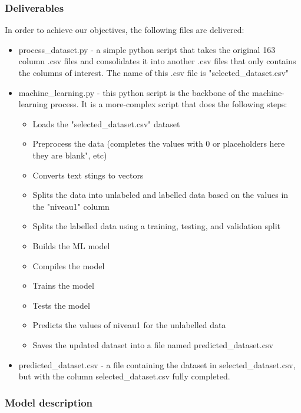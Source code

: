 \subsubsection{Deliverables}
In order to achieve our objectives, the following files are delivered: 
\begin{itemize}
    \item process\_dataset.py - a simple python script that takes the original 163 column .csv files and consolidates it into another .csv files that only contains the columns of interest. The name of this .csv file is "selected\_dataset.csv" 
    \item machine\_learning.py - this python script is the backbone of the machine-learning process. It is a more-complex script that does the following steps: 
        \begin{itemize}
            \item Loads the "selected\_dataset.csv" dataset
            \item Preprocess the data (completes the values with 0 or placeholders here they are blank", etc)
            \item Converts text stings to vectors
            \item Splits the data into unlabeled and labelled data based on the values in the "niveau1" column
            \item Splits the labelled data using a training, testing, and validation split
            \item Builds the ML model
            \item Compiles the model
            \item Trains the model
            \item Tests the model
            \item Predicts the values of niveau1 for the unlabelled data
            \item Saves the updated dataset into a file named predicted\_dataset.csv
        \end{itemize}
    \item predicted\_dataset.csv - a file containing the dataset in selected\_dataset.csv, but with the column selected\_dataset.csv fully completed. 
\end{itemize}
\subsubsection{Model description}

